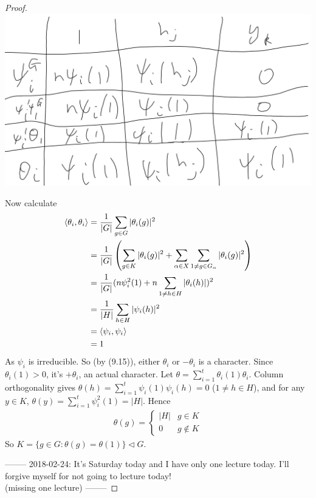 \documentclass[a4paper]{article}
\begin{document}
\begin{thm}
\begin{proof}
\includegraphics[scale=0.5]{image/Rep_08.png}

Now calculate
\begin{equation*}
\begin{aligned}
\langle \theta_i ,\theta_i \rangle &= \frac{1}{|G|} \sum_{g \in G} |\theta_i(g)|^2\\
&= \frac{1}{|G|} \left(\sum_{g \in K} |\theta_i(g)|^2 + \sum_{\alpha \in X} \sum_{1 \neq g \in G_\alpha} |\theta_i(g)|^2\right)\\
&= \frac{1}{|G|} (n\psi_i^2 (1) + n \sum_{1 \neq h \in H} |\theta_i (h)|)^2\\
&= \frac{1}{|H|} \sum_{h \in H} |\psi_i(h)|^2\\
&= \langle \psi_i,\psi_i\rangle\\
&= 1
\end{aligned}
\end{equation*}
As $\psi_i$ is irreducible. So (by (9.15)), either $\theta_i$ or $-\theta_i$ is a character. Since $\theta_i(1) > 0$, it's $+\theta_i$, an actual character. Let $\theta = \sum_{i=1}^t \theta_i(1) \theta_i$. Column orthogonality gives $\theta(h) = \sum_{i=1}^t \psi_i(1) \psi_i(h) = 0$ ($1 \neq h \in H$), and for any $y \in K$, $\theta(y) = \sum_{i=1}^t \psi_i^2 (1) = |H|$. Hence
\begin{equation*}
\begin{aligned}
\theta(g) = \left\{\begin{array}{ll}
|H| & g \in K\\
0 & g \not\in K
\end{array}
\right.
\end{aligned}
\end{equation*}
So $K = \{g \in G : \theta(g) = \theta(1) \} \triangleleft G$.

--------
2018-02-24: It's Saturday today and I have only one lecture today. I'll forgive myself for not going to lecture today!\\
(missing one lecture)
--------


\end{proof}
\end{thm}

\end{document}
